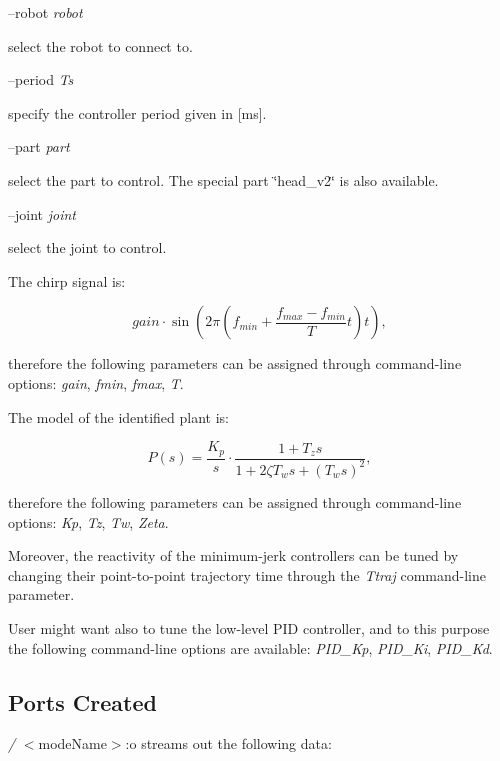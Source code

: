 --robot {\itshape robot} 
\begin{DoxyItemize}
\item select the robot to connect to.
\end{DoxyItemize}

--period {\itshape Ts} 
\begin{DoxyItemize}
\item specify the controller period given in \mbox{[}ms\mbox{]}.
\end{DoxyItemize}

--part {\itshape part} 
\begin{DoxyItemize}
\item select the part to control. The special part \char`\"{}head\+\_\+v2\char`\"{} is also available.
\end{DoxyItemize}

--joint {\itshape joint} 
\begin{DoxyItemize}
\item select the joint to control.
\end{DoxyItemize}

The chirp signal is\+:

\[ gain\cdot\sin\left(2\pi\left(f_{min}+\frac{f_{max}-f_{min}}{T}t\right)t\right), \]

therefore the following parameters can be assigned through command-\/line options\+: {\itshape gain}, {\itshape fmin}, {\itshape fmax}, {\itshape T}.

The model of the identified plant is\+:

\[ P\left(s\right)=\frac{K_p}{s}\cdot\frac{1+T_zs}{1+2\zeta T_ws+\left(T_ws\right)^2}, \]

therefore the following parameters can be assigned through command-\/line options\+: {\itshape Kp}, {\itshape Tz}, {\itshape Tw}, {\itshape Zeta}.

Moreover, the reactivity of the minimum-\/jerk controllers can be tuned by changing their point-\/to-\/point trajectory time through the {\itshape Ttraj} command-\/line parameter.

User might want also to tune the low-\/level P\+I\+D controller, and to this purpose the following command-\/line options are available\+: {\itshape P\+I\+D\+\_\+\+Kp}, {\itshape P\+I\+D\+\_\+\+Ki}, {\itshape P\+I\+D\+\_\+\+Kd}.\hypertarget{group__icub__tld_portsc_sec}{}\subsection{Ports Created}\label{group__icub__tld_portsc_sec}
{\itshape /} $<$mode\+Name$>$\+:o streams out the following data\+:

